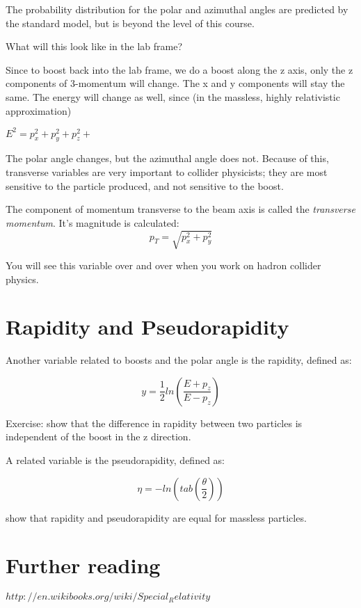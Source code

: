 The probability distribution for the polar and azimuthal angles are predicted by the standard model, but is beyond the level of this course.

What will this look like in the lab frame?

Since to boost back into the lab frame, we do a boost along the z axis, only the z components of 3-momentum will change.  The x and y components will stay the same.  The energy will change as well, since (in the massless, highly relativistic approximation)

\noindent $E^2 = p_x^2 + p_y^2 + p_z^2 +$  

The polar angle changes, but the azimuthal angle does not.  Because of this, transverse variables are very important to collider physicists; they are most sensitive to the particle produced, and not sensitive to the boost.

The component of momentum transverse to the beam axis is called the {\it transverse momentum}.  It's magnitude is calculated:
\begin{equation}
	 p_T =   \sqrt{p_x^2 +p_y^2}
\end{equation} 
  

You will see this variable over and over when you work on hadron collider physics.

\section{Rapidity and Pseudorapidity}

Another variable related to boosts and the polar angle is the rapidity, defined as:

\begin{equation}
	 y =  \frac{1}{2} ln (\frac{E + p_z}{E-p_z})
\end{equation} 
	  

Exercise: show that the difference in rapidity between two particles is independent of the boost in the z direction.

A related variable is the pseudorapidity, defined as:

\begin{equation}
	 \eta  = - ln (tab (\frac{\theta}{2}))
\end{equation} 


\vspace{.2cm} 
\begin{minipage}{0.9\textwidth} 
\begin{framed}
\begin{exercise}
{show that rapidity and pseudorapidity are equal for massless particles.}
\end{exercise}
\end{framed} 
\end{minipage}
\vspace{.2cm}



\section{Further reading}
	
$http://en.wikibooks.org/wiki/Special_Relativity$

